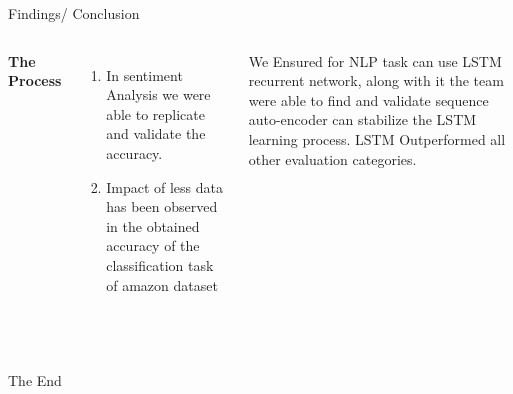 \documentclass[aspectratio=169,xcolor=dvipsnames]{beamer}
\begin{document}
\begin{frame}{Findings/ Conclusion}

    \tableofcontents

    \begin{columns}[c] %

        \textbf{The Process}
        \begin{enumerate}
            \item In sentiment Analysis we were able to replicate and validate the accuracy.
            \item Impact of less data has been observed in the obtained accuracy of the classification task of amazon dataset
        \end{enumerate}

         We Ensured for NLP task can use LSTM recurrent network, along with it the team were able to find and validate sequence auto-encoder can stabilize the LSTM learning process. LSTM Outperformed all other evaluation categories.

    \end{columns}   \\

\end{frame}

\begin{frame}
    \Huge{\centerline{The End}}
\end{frame}

\end{document}

